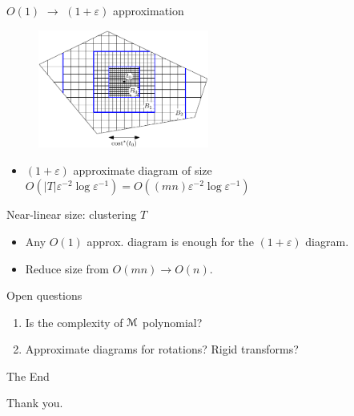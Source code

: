 \documentclass[xcolor={dvipsnames,usenames},handout]{beamer} %
\newcommand{\eps}{\varepsilon}
\def\abs#1{\mathopen| #1 \mathclose|}		%
\newcommand{\M}{\EuScript{M}}
\begin{document}
\begin{frame}{$O(1)$ $\rightarrow$ $(1+\eps)$ approximation}
\begin{figure}
\begin{center}
\includegraphics[width=0.5\textwidth,page=1]{nested-grid-crop}%
\end{center}
\end{figure}
\begin{itemize}
\item $(1+\eps)$ approximate diagram of size
	$O(\abs{T}\eps^{-2}\log\eps^{-1}) = O((mn)\eps^{-2}\log\eps^{-1})$
\end{itemize}
\end{frame}

\begin{frame}{Near-linear size: clustering $T$}
\begin{itemize}
\item Any $O(1)$ approx. diagram is enough for the $(1+\eps)$ diagram.
\item Reduce size from $O(mn) \rightarrow O(n)$.
\end{itemize}
\end{frame}

\begin{frame}{Open questions}
\begin{enumerate}
\item Is the complexity of $\M$ polynomial?
\item Approximate diagrams for rotations? Rigid transforms?
\end{enumerate}
\end{frame}

\begin{frame}{The End}
\begin{center}
	Thank you.
\end{center}
\end{frame}

%
%
\end{document}
